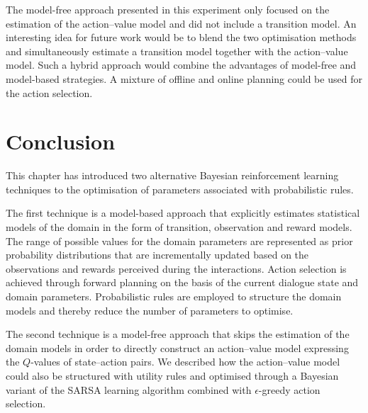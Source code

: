 
The model-free approach presented in this experiment only focused on the estimation of the action--value model and did not include a transition model.  An interesting idea for future work would be to blend the two optimisation methods and simultaneously estimate a transition model together with the action--value model.  Such a hybrid approach would combine the advantages of model-free and model-based strategies. A mixture of offline and online planning  \citep[as demonstrated by e.g.][]{RossC07} could be used for the action selection. 

\section{Conclusion}


This chapter has introduced two alternative Bayesian reinforcement learning techniques to the optimisation of parameters associated with probabilistic rules.

The first technique is a model-based approach that explicitly estimates statistical models of the domain in the form of transition, observation and reward models.  The range of possible values for the domain parameters are represented as prior probability distributions that are incrementally updated based on the observations and rewards perceived during the interactions. Action selection is achieved through forward planning on the basis of the current dialogue state and domain parameters. Probabilistic rules are employed to structure the domain models and thereby reduce the number of parameters to optimise. 

The second technique is a model-free approach that skips the estimation of the domain models in order to directly construct an action--value model expressing the $Q$-values of state--action pairs.  We described how the action--value model could also be structured with utility rules and optimised through a Bayesian variant of the SARSA learning algorithm combined with $\epsilon$-greedy action selection. 


